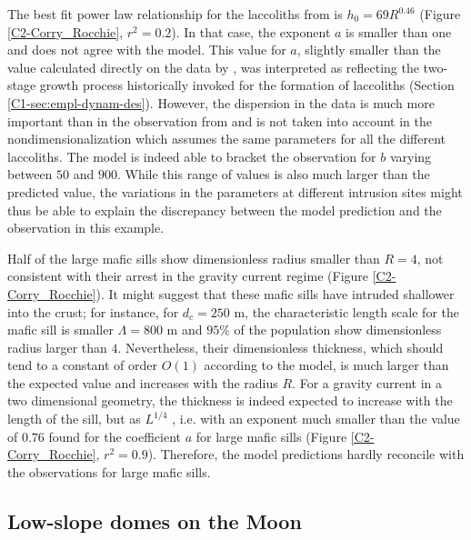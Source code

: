 The  best  fit   power  law  relationship  for   the  laccoliths  from
\citet{E:2015tl}     is     $h_0     =    69     R^{0.46}$     (Figure
\ref{C2-Corry_Rocchie}, $r^2 =0.2$). In that case, the exponent $a$ is
smaller than  one and does not  agree with the model.   This value for
$a$, slightly smaller  than the value calculated directly  on the data
by  \citet{McCaffrey:1997ea},   was  interpreted  as   reflecting  the
two-stage  growth process  historically invoked  for the  formation of
laccoliths   (Section   \ref{C1-sec:empl-dynam-des}).   However,   the
dispersion in the data is much  more important than in the observation
from  \citet{Rocchi:2010dn}  and is  not  taken  into account  in  the
nondimensionalization which  assumes the  same parameters for  all the
different  laccoliths.   The  model  is indeed  able  to  bracket  the
observation for $b$ varying between  $50$ and $900$.  While this range
of values is also much larger than the predicted value, the variations
in the parameters  at different intrusion sites might thus  be able to
explain  the   discrepancy  between  the  model   prediction  and  the
observation in this example.


Half of the  large mafic sills show dimensionless  radius smaller than
$R=4$, not consistent with their  arrest in the gravity current regime
(Figure \ref{C2-Corry_Rocchie}).   It might  suggest that  these mafic
sills  have  intruded shallower  into  the  crust; for  instance,  for
$d_c=250$ m,  the characteristic  length scale for  the mafic  sill is
smaller   $\Lambda=800$  m   and   $95\%$  of   the  population   show
dimensionless   radius   larger   than   $4$.    Nevertheless,   their
dimensionless  thickness, which  should tend  to a  constant of  order
$O(1)$ according to the model, is  much larger than the expected value
and increases  with the radius  $R$.  For a  gravity current in  a two
dimensional  geometry, the  thickness is  indeed expected  to increase
with the length of the  sill, but as $L^{1/4}$ \citep{Michaut:2011kg},
i.e. with an exponent much smaller  than the value of $0.76$ found for
the    coefficient    $a$    for    large    mafic    sills    (Figure
\ref{C2-Corry_Rocchie}, $r^2=0.9$).  Therefore,  the model predictions
hardly reconcile with the observations for large mafic sills.


\subsection{Low-slope domes on the Moon}
\label{C2-sec:observ-vs-pred}

